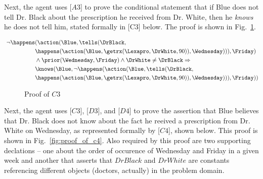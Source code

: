 \noindent Next, the agent uses [$A3$] to prove the conditional statement that if Blue does not tell Dr. Black about the prescription he received from Dr. White, then he \emph{knows} he does not tell him, stated formally in [C3] below.  The proof is shown in Fig.~\ref{fig:proof_of_c3}.

\begin{footnotesize}
\begin{align*}
[C3] \ \neg \happens&(\action(\Blue,\tells(\DrBlack,\\
& \happens(\action(\Blue,\getrx(\Lexapro,\DrWhite,90)),\Wednesday))),\Friday) \\
& \wedge \prior(\Wednesday,\Friday) \wedge \DrWhite \neq \DrBlack \Rightarrow \\
& \knows(\Blue, \neg \happens(\action(\Blue,\tells(\DrBlack,\\ 
& \happens(\action(\Blue,\getrx(\Lexapro,\DrWhite,90)),\Wednesday))),\Friday))
\end{align*}
\end{footnotesize}

\begin{figure}[h!] 
\vspace{6pt}
\centering
{}
\caption{Proof of $C3$}
\label{fig:proof_of_c3}
\end{figure}



\noindent Next, the agent uses [$C3$], [$D3$], and [$D4$] to prove the assertion that Blue believes that Dr. Black does not know about the fact he reeived a prescription from Dr. White on Wednesday, as represented formally by [$C4$], shown below.  This proof is shown in Fig.~\ref{fig:proof_of_c4}.  Also required by this proof are two supporting declations -- one about the order of occurence of Wednesday and Friday in a given week and another that asserts that $DrBlack$ and $DrWhite$ are constants referencing different objects (doctors, actually) in the problem domain.

